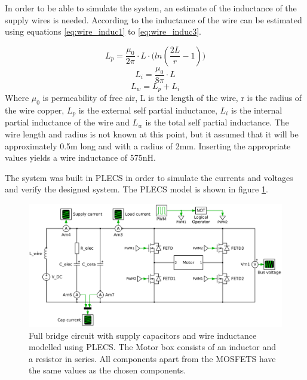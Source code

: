 In order to be able to simulate the system, an estimate of the inductance of the supply wires is needed.
According to \cite{partial_induc} the inductance of the wire can be estimated using equations \ref{eq:wire_induc1} to \ref{eq:wire_induc3}.

\begin{equation}
	L_p = \frac{\mu_0}{2 \pi} \cdot L \cdot \big(ln(\frac{2L}{r}-1)\big)
	\label{eq:wire_induc1}
\end{equation}
\begin{equation}
	L_i = \frac{\mu_0}{8 \pi} \cdot L
\end{equation}
\begin{equation}
	L_w = L_p + L_i
	\label{eq:wire_induc3}
\end{equation}
Where $\mu_0$ is permeability of free air, L is the length of the wire, r is the radius of the wire copper, $L_p$ is the external self partial inductance, $L_i$ is the internal partial inductance of the wire and $L_w$ is the total self partial inductance.
The wire length and radius is not known at this point, but it assumed that it will be approximately 0.5m long and with a radius of 2mm. 
Inserting the appropriate values yields a wire inductance of 575nH.

The system was built in PLECS in order to simulate the currents and voltages and verify the designed system.
The PLECS model is shown in figure \ref{fig:plecs_schem}.

\begin{figure}[h]
	\centering
	\includegraphics[width=1\linewidth]{graphics/plecs_schem.png}
	\caption{Full bridge circuit with supply capacitors and wire inductance modelled using PLECS. The Motor box consists of an inductor and a resistor in series. All components apart from the MOSFETS have the same values as the chosen components.}
	\label{fig:plecs_schem}
\end{figure}	

